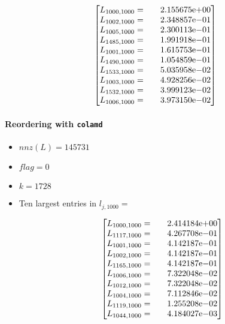 \begin{enumerate}
\begin{itemize}
$$
\begin{bmatrix}
L_{1000,1000}=  & \quad {2.155675}\mathrm{e}{+00}\\
L_{1002,1000}=  & \quad {2.348857}\mathrm{e}{-01}\\
L_{1005,1000}=  & \quad {2.300113}\mathrm{e}{-01}\\
L_{1485,1000}=  & \quad {1.991918}\mathrm{e}{-01}\\
L_{1001,1000}=  & \quad {1.615753}\mathrm{e}{-01}\\
L_{1490,1000}=  & \quad {1.054859}\mathrm{e}{-01}\\
L_{1533,1000}=  & \quad {5.035958}\mathrm{e}{-02}\\
L_{1003,1000}=  & \quad {4.928256}\mathrm{e}{-02}\\
L_{1532,1000}=  & \quad {3.999123}\mathrm{e}{-02}\\
L_{1006,1000}=  & \quad {3.973150}\mathrm{e}{-02}\\
\end{bmatrix}
$$
\end{itemize}
\newpage
\paragraph*{Reordering with \texttt{colamd}}
\begin{itemize}
\item $nnz(L)= 145731$
\item $flag= 0$
\item $k= 1728$
\item Ten largest entries in $l_{j,1000}= $

$$
\begin{bmatrix}
L_{1000,1000}=  & \quad {2.414184}\mathrm{e}{+00}\\
L_{1117,1000}=  & \quad {4.267708}\mathrm{e}{-01}\\
L_{1001,1000}=  & \quad {4.142187}\mathrm{e}{-01}\\
L_{1002,1000}=  & \quad {4.142187}\mathrm{e}{-01}\\
L_{1165,1000}=  & \quad {4.142187}\mathrm{e}{-01}\\
L_{1006,1000}=  & \quad {7.322048}\mathrm{e}{-02}\\
L_{1012,1000}=  & \quad {7.322048}\mathrm{e}{-02}\\
L_{1004,1000}=  & \quad {7.112846}\mathrm{e}{-02}\\
L_{1119,1000}=  & \quad {1.255208}\mathrm{e}{-02}\\
L_{1044,1000}=  & \quad {4.184027}\mathrm{e}{-03}\\
\end{bmatrix}
$$
\end{itemize}

\end{enumerate}
